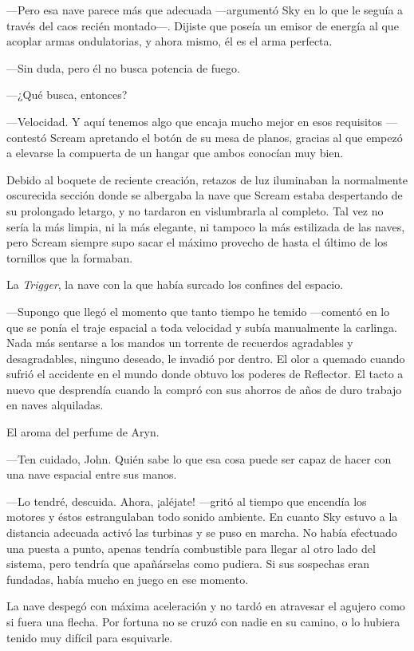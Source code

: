 ---Pero esa nave parece más que adecuada ---argumentó Sky en lo que le seguía a través del caos recién montado---. Dijiste que poseía un emisor de energía al que acoplar armas ondulatorias, y ahora mismo, él es el arma perfecta.

---Sin duda, pero él no busca potencia de fuego.

---¿Qué busca, entonces?

---Velocidad. Y aquí tenemos algo que encaja mucho mejor en esos requisitos ---contestó Scream apretando el botón de su mesa de planos, gracias al que empezó a elevarse la compuerta de un hangar que ambos conocían muy bien.

Debido al boquete de reciente creación, retazos de luz iluminaban la normalmente oscurecida sección donde se albergaba la nave que Scream estaba despertando de su prolongado letargo, y no tardaron en vislumbrarla al completo. Tal vez no sería la más limpia, ni la más elegante, ni tampoco la más estilizada de las naves, pero Scream siempre supo sacar el máximo provecho de hasta el último de los tornillos que la formaban.

La \emph{Trigger}, la nave con la que había surcado los confines del espacio.

---Supongo que llegó el momento que tanto tiempo he temido ---comentó en lo que se ponía el traje espacial a toda velocidad y subía manualmente la carlinga. Nada más sentarse a los mandos un torrente de recuerdos agradables y desagradables, ninguno deseado, le invadió por dentro. El olor a quemado cuando sufrió el accidente en el mundo donde obtuvo los poderes de Reflector. El tacto a nuevo que desprendía cuando la compró con sus ahorros de años de duro trabajo en naves alquiladas.

El aroma del perfume de Aryn.

---Ten cuidado, John. Quién sabe lo que esa cosa puede ser capaz de hacer con una nave espacial entre sus manos.

---Lo tendré, descuida. Ahora, ¡aléjate! ---gritó al tiempo que encendía los motores y éstos estrangulaban todo sonido ambiente. En cuanto Sky estuvo a la distancia adecuada activó las turbinas y se puso en marcha. No había efectuado una puesta a punto, apenas tendría combustible para llegar al otro lado del sistema, pero tendría que apañárselas como pudiera. Si sus sospechas eran fundadas, había mucho en juego en ese momento.

La nave despegó con máxima aceleración y no tardó en atravesar el agujero como si fuera una flecha. Por fortuna no se cruzó con nadie en su camino, o lo hubiera tenido muy difícil para esquivarle.

